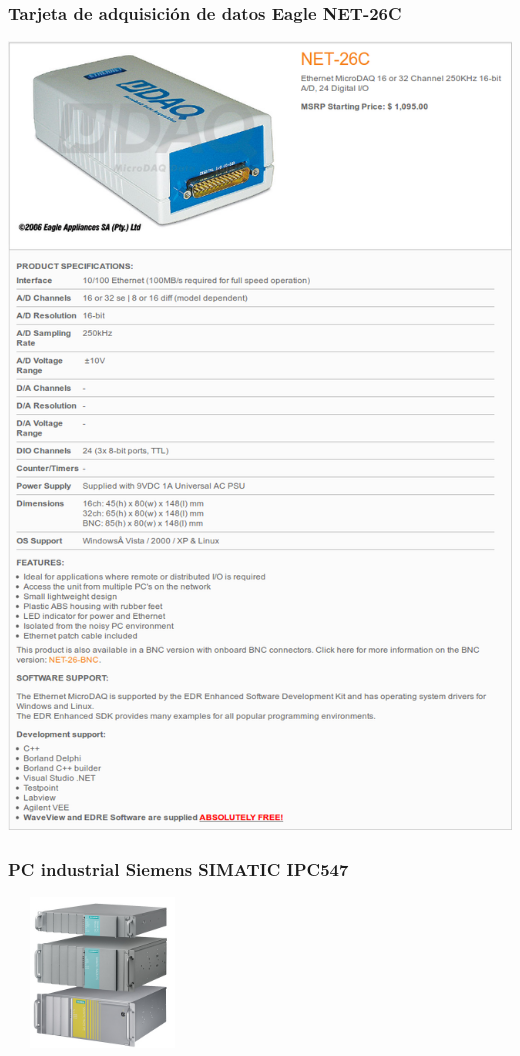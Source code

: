\subsubsection{Tarjeta de adquisición de datos Eagle NET-26C}
\hspace*{0cm}
\includegraphics[scale=0.63]{Datasheets/10Tarjeta.png}
\newpage
\subsubsection{PC industrial Siemens SIMATIC IPC547}
\hspace*{0cm}
\includegraphics[width=5cm,height=4cm,keepaspectratio]{Datasheets/12Foto.png} 

